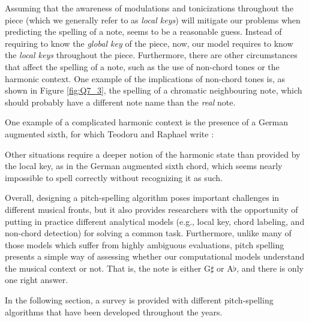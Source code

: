 Assuming that the awareness of modulations and tonicizations
throughout the piece (which we generally refer to as
\emph{local keys}) will mitigate our problems when
predicting the spelling of a note, seems to be a reasonable
guess. Instead of requiring to know the \emph{global key} of
the piece, now, our model requires to know the \emph{local
keys} throughout the piece. Furthermore, there are other
circumstances that affect the spelling of a note, such as
the use of non-chord tones or the harmonic context. One
example of the implications of non-chord tones is, as shown
in Figure \ref{fig:Q7_3}, the spelling of a chromatic
neighbouring note, which should probably have a different
note name than the \emph{real} note.


One example of a complicated harmonic context is the
presence of a German augmented sixth, for which Teodoru and
Raphael write \parencite{teodoru2007pitch}:

\begin{italicquotes}
Other situations require a deeper notion of the harmonic
state than provided by the local key, as in the German
augmented sixth chord, which seems nearly impossible to
spell correctly without recognizing it as such.
\end{italicquotes}

Overall, designing a pitch-spelling algorithm poses
important challenges in different musical fronts, but it
also provides researchers with the opportunity of putting in
practice different analytical models (e.g., local key, chord
labeling, and non-chord detection) for solving a common
task. Furthermore, unlike many of those models which suffer
from highly ambiguous evaluations, pitch spelling presents a
simple way of assessing whether our computational models
understand the musical context or not. That is, the note is
either G$\sharp$ or A$\flat$, and there is only one right
answer.

In the following section, a survey is provided with
different pitch-spelling algorithms that have been developed
throughout the years.
